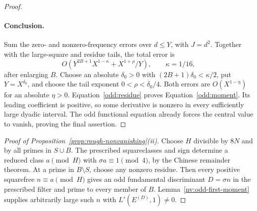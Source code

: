 \begin{proof}
\paragraph{Conclusion.}
Sum the zero- and nonzero-frequency errors over $d\le Y$, with $J=d^2$.
Together with the large-square and residue tails, the total error is
\[
 O\left(Y^{2B+1}X^{1-\kappa}+X^{1+\rho}/Y\right),
 \qquad \kappa=1/16,
\]
after enlarging $B$.  Choose an absolute $\delta_0>0$ with
$(2B+1)\delta_0<\kappa/2$, put $Y=X^{\delta_0}$, and choose the
tail exponent $0<\rho<\delta_0/4$.
Both errors are $O(X^{1-\eta})$ for an absolute $\eta>0$.
Equation~\eqref{odd:residue} proves Equation~\eqref{odd:moment}.
Its leading coefficient is positive, so some derivative is nonzero in
every sufficiently large dyadic interval.  The odd functional equation
already forces the central value to vanish, proving the final assertion.
\end{proof}

\begin{proof}[Proof of Proposition~\ref{prop:rough-nonvanishing}\textup{(ii)}]
Choose $H$ divisible by $8N$ and by all primes in $S\cup B$.
The prescribed squareclasses and sign determine a reduced class
$a\pmod H$ with $\sigma a\equiv1\pmod4$, by the Chinese remainder
theorem. At a prime in $B\setminus S$, choose any nonzero residue.
Then every positive squarefree $n\equiv a\pmod H$ gives an odd
fundamental discriminant $D=\sigma n$ in the prescribed filter and
prime to every member of $B$. Lemma~\ref{nv:odd-first-moment} supplies
arbitrarily large such $n$ with $L'(E^{(D)},1)\ne0$.
\end{proof}
